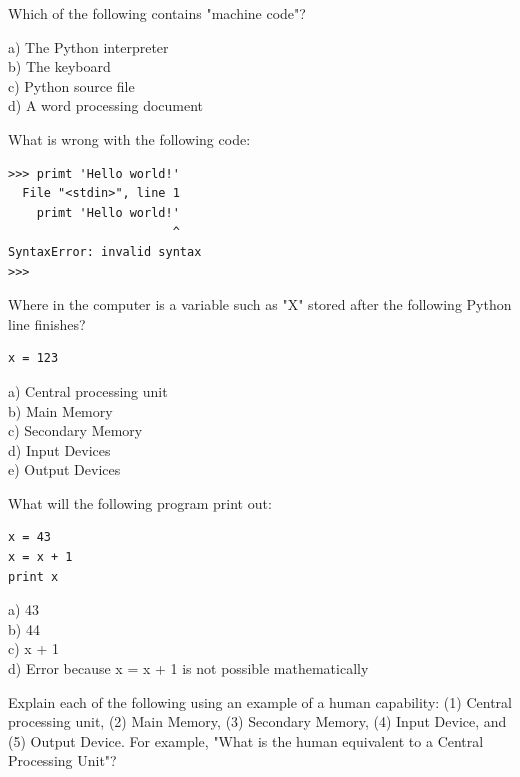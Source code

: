 \documentclass[11pt]{book}
\begin{document}
\begin{ex}
Which of the following contains "machine code"?

a) The Python interpreter\\
b) The keyboard\\
c) Python source file\\
d) A word processing document
\end{ex}

\begin{ex}
What is wrong with the following code:

\beforeverb
\begin{verbatim}
>>> primt 'Hello world!'
  File "<stdin>", line 1
    primt 'Hello world!'
                       ^
SyntaxError: invalid syntax
>>> 
\end{verbatim}
\afterverb

\end{ex}

\begin{ex}
Where in the computer is a variable such as "X" stored 
after the following Python line finishes?

\beforeverb
\begin{verbatim}
x = 123
\end{verbatim}
\afterverb
%
a) Central processing unit\\
b) Main Memory\\
c) Secondary Memory\\
d) Input Devices\\
e) Output Devices
\end{ex}

\begin{ex}
What will the following program print out:

\beforeverb
\begin{verbatim}
x = 43
x = x + 1
print x
\end{verbatim}
\afterverb
%
a) 43\\
b) 44\\
c) x + 1\\
d) Error because x = x + 1 is not possible mathematically
\end{ex}

\begin{ex}
Explain each of the following using an example of a human capability: 
(1) Central processing unit, (2) Main Memory, (3) Secondary Memory, 
(4) Input Device, and
(5) Output Device.
For example, "What is the human equivalent to a Central Processing Unit"? 
\end{ex}
\end{document}
